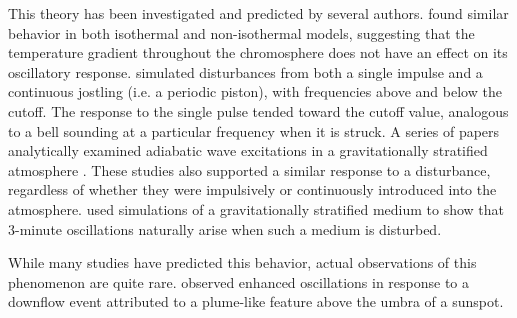 This theory has been investigated and predicted by several authors.
\cite{Fleck1991} found similar behavior in
both isothermal and non-isothermal models, suggesting that the temperature
gradient throughout the chromosphere does not have an effect on its oscillatory
response. \cite{Kalkofen1994} simulated disturbances from both a single impulse
and a continuous jostling (i.e. a periodic piston), with frequencies above and
below the cutoff. The response to the single pulse tended toward the cutoff
value, analogous to a bell sounding at a particular frequency when it is
struck. A series of papers analytically examined adiabatic wave excitations in
a gravitationally stratified atmosphere \citep{Sutmann1995a, Sutmann1995b,
Sutmann1998}. These studies also supported a similar response to a disturbance,
regardless of whether they were impulsively or continuously introduced into the
atmosphere. \cite{Chae2015} used simulations of a gravitationally stratified
medium to show that 3-minute oscillations naturally arise when such a medium is
disturbed.

While many studies have predicted this behavior,
actual observations of this phenomenon are quite rare.
\cite{Kwak2016}
observed enhanced oscillations in response to a downflow
event attributed to a plume-like feature above the umbra of a sunspot.







%
%
%


\newpage

